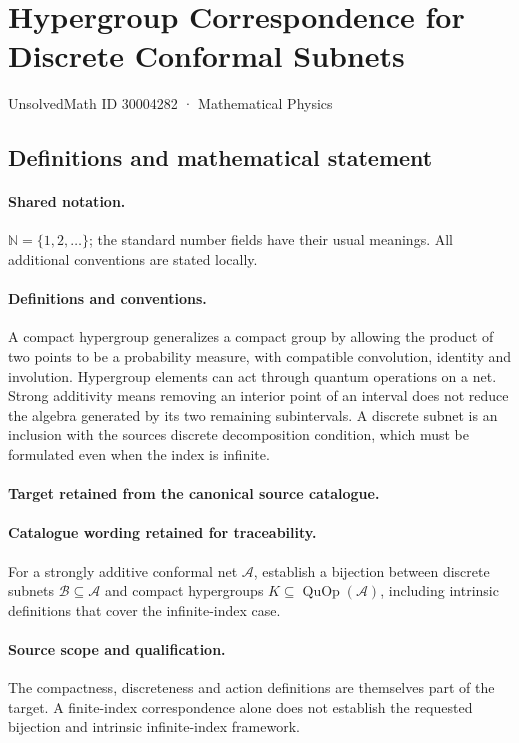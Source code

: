 \documentclass[11pt]{article}
\begin{document}
\setcounter{section}{30004281}
\section{Hypergroup Correspondence for Discrete Conformal Subnets}\label{30004282}
{\small UnsolvedMath ID 30004282 · Mathematical Physics}
\subsection{Definitions and mathematical statement}

\paragraph{Shared notation.}$\mathbb N=\{1,2,\ldots\}$; the standard number fields have their usual meanings. All additional conventions are stated locally.


\paragraph{Definitions and conventions.}
A compact hypergroup generalizes a compact group by allowing the product of two points to be a probability measure, with compatible convolution, identity and involution. Hypergroup elements can act through quantum operations on a net. Strong additivity means removing an interior point of an interval does not reduce the algebra generated by its two remaining subintervals. A discrete subnet is an inclusion with the source\textquotesingle s discrete decomposition condition, which must be formulated even when the index is infinite.

\paragraph{Target retained from the canonical source catalogue.}
\paragraph{Catalogue wording retained for traceability.}
For a strongly additive conformal net $\mathcal A$, establish a bijection between discrete subnets $\mathcal B\subseteq\mathcal A$ and compact hypergroups $K\subseteq\operatorname{QuOp}(\mathcal A)$, including intrinsic definitions that cover the infinite-index case.

\paragraph{Source scope and qualification.}
The compactness, discreteness and action definitions are themselves part of the target. A finite-index correspondence alone does not establish the requested bijection and intrinsic infinite-index framework.
\end{document}

